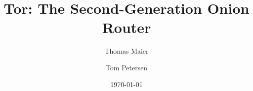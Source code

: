 \documentclass[11pt,twocolumn,a4paper,DIV=calc]{scrartcl}
\begin{document}
\title{Tor: The Second-Generation Onion Router}
\author{	Thomas Maier \and Tom Petersen}
\date{\today}

\maketitle







 

\end{document}
